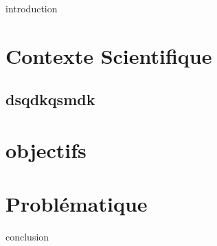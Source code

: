
\chaptertoc{}

\label{sec:2-int}
{introduction}

\Blindtext

\section{Contexte Scientifique}
\label{sec:2-1}

\Blindtext

\subsection{dsqdkqsmdk}

\blindtext

\section{objectifs}
\label{sec:2-2}

\Blindtext

\section{Problématique}
\label{sec:2-2}

\Blindtext

\label{sec:2-cnc}
{conclusion}

\Blindtext

